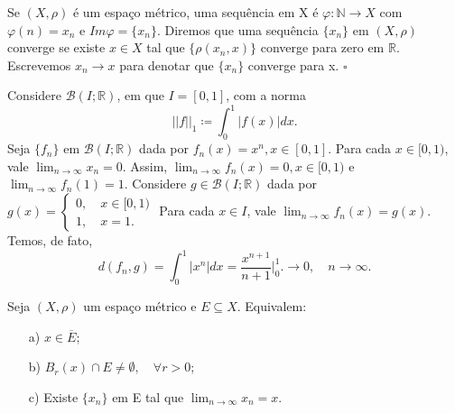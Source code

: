 \documentclass[MetricSpaces/metric_notes.tex]{subfiles}
\begin{document}
\begin{def*}
	Se \((X, \rho )\) é um espaço métrico, uma sequência em X é \(\varphi:\mathbb{N}\rightarrow X\) com \(\varphi(n) = x_{n}\) e
	\(Im\varphi = \{x_{n}\}\). Diremos que uma sequência \(\{x_{n}\}\) em \((X, \rho )\) converge se existe \(x\in X\)
	tal que \(\{\rho(x_{n}, x)\}\) converge para zero em \(\mathbb{R}\). Escrevemos \(x_{n}\rightarrow x\) para denotar que \(\{x_{n}\}\)
	converge para x. \(\square\)
\end{def*}
\begin{example}
	Considere \(\mathcal{B}(I; \mathbb{R})\), em que \(I = [0, 1]\), com a norma
	\[
		||f||_{1}\coloneqq \int_{0}^{1}|f(x)|dx.
	\]
	Seja \(\{f_{n}\}\) em \(\mathcal{B}(I; \mathbb{R})\) dada por \(f_{n}(x) =x^{n}, x\in[0,1]\). Para cada \(x\in[0, 1)\), vale
	\(\lim_{n\to \infty}x_{n} = 0\). Assim, \(\lim_{n\to \infty}f_{n}(x) = 0, x\in[0, 1)\) e \(\lim_{n\to \infty}f_{n}(1) = 1.\) Considere \(g\in \mathcal{B}(I; \mathbb{R})\)
	dada por \(g(x) = \left\{\begin{array}{ll}
		0,\quad x\in[0, 1) \\
		1,\quad x=1.
	\end{array}\right.\)
	Para cada \(x\in I\), vale \(\lim_{n\to \infty}f_{n}(x)=g(x)\). Temos, de fato,
	\[
		d(f_{n}, g)= \int_{0}^{1}|x^{n}|dx = \frac{x^{n+1}}{n+1}\biggl|_{0}^{1}\biggr.\longrightarrow 0,\quad n\to\infty.
	\]
\end{example}
\begin{prop*}
	Seja \((X, \rho )\) um espaço métrico e \(E\subseteq{X}\). Equivalem:
	\begin{itemize}
		\item[a)] \(x\in \overline{E}\);
		\item[b)] \(B_{r}(x)\cap E \neq\emptyset,\quad \forall r>0\);
		\item[c)] Existe \(\{x_{n}\}\) em E tal que \(\lim_{n\to \infty}x_{n} = x.\)
	\end{itemize}
\end{prop*}
\end{document}
